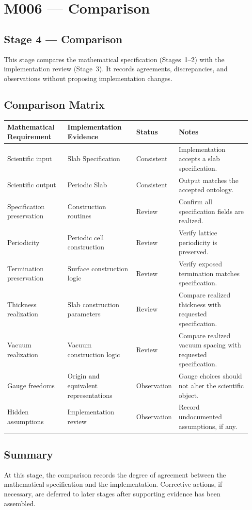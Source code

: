 \chapter{M006 --- Comparison}

\section{Stage 4 --- Comparison}

This stage compares the mathematical specification (Stages~1--2) with the
implementation review (Stage~3). It records agreements, discrepancies, and
observations without proposing implementation changes.

\section{Comparison Matrix}

\begin{tabular}{p{}p{}p{}p{}}
\textbf{Mathematical Requirement} &
\textbf{Implementation Evidence} &
\textbf{Status} &
\textbf{Notes} \\
\hline
Scientific input &
Slab Specification &
Consistent &
Implementation accepts a slab specification.\\
Scientific output &
Periodic Slab &
Consistent &
Output matches the accepted ontology.\\
Specification preservation &
Construction routines &
Review &
Confirm all specification fields are realized.\\
Periodicity &
Periodic cell construction &
Review &
Verify lattice periodicity is preserved.\\
Termination preservation &
Surface construction logic &
Review &
Verify exposed termination matches specification.\\
Thickness realization &
Slab construction parameters &
Review &
Compare realized thickness with requested specification.\\
Vacuum realization &
Vacuum construction logic &
Review &
Compare realized vacuum spacing with requested specification.\\
Gauge freedoms &
Origin and equivalent representations &
Observation &
Gauge choices should not alter the scientific object.\\
Hidden assumptions &
Implementation review &
Observation &
Record undocumented assumptions, if any.\\
\end{tabular}

\section{Summary}

At this stage, the comparison records the degree of agreement between the
mathematical specification and the implementation. Corrective actions, if
necessary, are deferred to later stages after supporting evidence has been
assembled.
